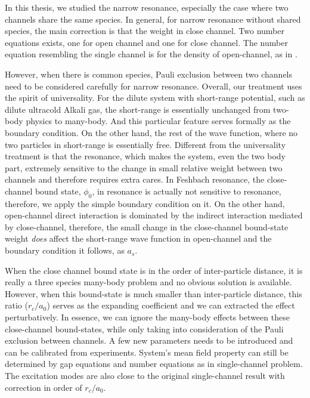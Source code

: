 % 
In this thesis, we studied the narrow resonance, especially the case where two channels share the same species.  In general, for narrow resonance without shared species, the main correction is that the weight in close channel.  Two number equations exists, one for open channel and one for close channel.  The number equation resembling the single channel is for the density of open-channel, as in  \cite{GurarieNarrow}.  

However, when there is common species,  Pauli exclusion between two channels need to be considered carefully for narrow resonance.  Overall, our treatment uses the spirit of universality.  For the dilute system with short-range potential, such as dilute ultracold Alkali gas, the short-range is essentially unchanged from two-body physics to many-body.  And this particular feature serves formally as the boundary condition.  On the other hand, the rest of the wave function, where no two particles in short-range is essentially free.  Different from the universality treatment is that the resonance, which makes the system, even the two body part, extremely sensitive to the change in small relative weight between two channels and therefore requires extra cares.  In Feshbach resonance, the close-channel bound state, $\phi_{0}$, in resonance is actually not sensitive to resonance, therefore, we apply the simple boundary condition on it. On the other hand, open-channel direct interaction is dominated by the indirect interaction mediated by close-channel, therefore, the small change in the close-channel bound-state weight \emph{does} affect the short-range wave function in open-channel and the boundary condition it follows, as $a_{s}$. 

When the close channel bound state is in the order of   inter-particle distance, it is really a three species many-body problem and no obvious solution is available.  However, when this bound-state is much smaller than inter-particle distance, this ratio ($r_{c}/a_{0}$) serves as the expanding coefficient and we can extracted the effect perturbatively.  In essence, we can ignore the many-body effects between these close-channel bound-states, while only taking into consideration of the Pauli exclusion between channels.  A few new parameters needs to be introduced and can be calibrated from experiments.  System's mean field property can still be determined by gap equations and number equations as in single-channel problem.  The excitation modes are also close to the original single-channel result with correction in order of $r_{c}/a_{0}$.


